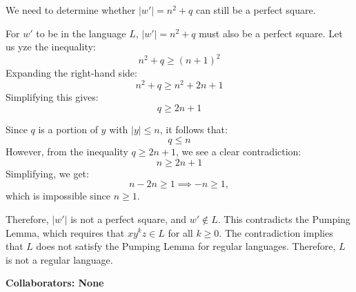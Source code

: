 \documentclass[12 pt]{article}
\begin{document}
We need to determine whether \( |w'| = n^2 + q \) can still be a perfect square.

For \( w' \) to be in the language \( L \), \( |w'| = n^2 + q \) must also be a perfect square. Let us yze the inequality:
\[
n^2 + q \geq (n + 1)^2
\]
Expanding the right-hand side:
\[
n^2 + q \geq n^2 + 2n + 1
\]
Simplifying this gives:
\[
q \geq 2n + 1
\]

Since \(q\) is a portion of \(y\) with \( |y| \leq n \), it follows that:
\[
q \leq n
\]
However, from the inequality \( q \geq 2n + 1 \), we see a clear contradiction:
\[
n \geq 2n + 1
\]
Simplifying, we get:
\[
n - 2n \geq 1 \implies -n \geq 1,
\]
which is impossible since \( n \geq 1 \).

Therefore, \( |w'| \) is not a perfect square, and \( w' \notin L \). This contradicts the Pumping Lemma, which requires that \( xy^kz \in L \) for all \( k \geq 0 \). The contradiction implies that \( L \) does not satisfy the Pumping Lemma for regular languages. Therefore, \( L \) is not a regular language.

\vspace{1cm}

\noindent\textbf{Collaborators: None}
\end{document}
